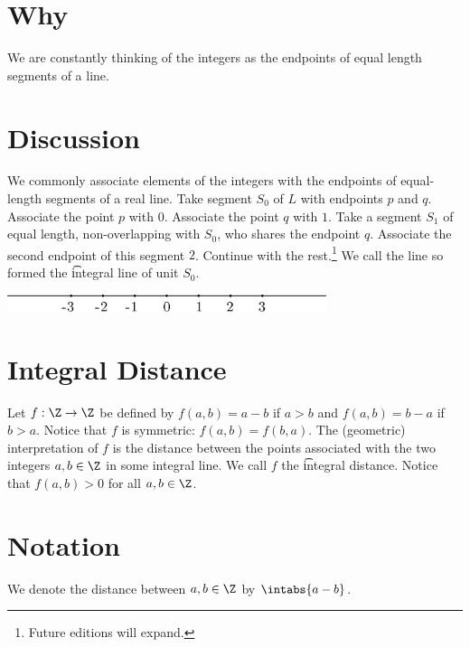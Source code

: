 

\section*{Why}

We are constantly thinking of the integers as the endpoints of equal length segments of a line.

\section*{Discussion}

We commonly associate elements of the integers with the endpoints of equal-length segments of a real line.
Take segment $S_0$ of $L$ with endpoints $p$ and $q$.
Associate the point $p$ with $0$.
Associate the point $q$ with $1$.
Take a segment $S_1$ of equal length, non-overlapping with $S_0$, who shares the endpoint $q$.
Associate the second endpoint of this segment $2$.
Continue with the rest.\footnote{Future editions will expand.}
We call the line so formed the \t{integral line} of unit $S_0$.

\begin{center}\includegraphics[width=0.70\textwidth]{./graphics/integral_line.pdf}\end{center}
\section*{Integral Distance}

Let $f: \Z  \to \Z $ be defined by $f(a, b) = a - b$ if $a > b$ and $f(a, b) = b - a$ if $b > a$.
Notice that $f$ is symmetric: $f(a,b) = f(b, a)$.
The (geometric) interpretation of $f$ is the distance between the points associated with the two integers $a, b \in \Z $ in some integral line.
We call $f$ the \t{integral distance}.
Notice that $f(a, b) > 0$ for all $a, b \in \Z $.

\section*{Notation}

We denote the distance between $a, b \in \Z $ by $\intabs{a - b}$.

\blankpage